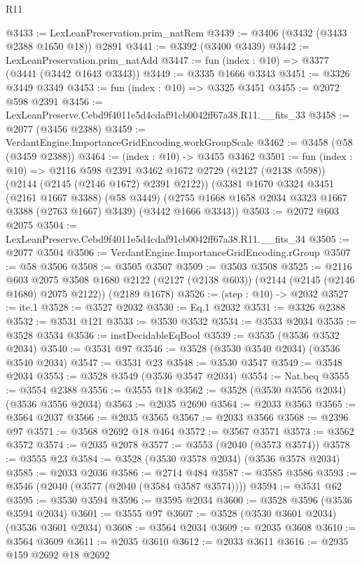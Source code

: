 \begin{lexlean}{R11}
\begin{coremodule}
@3433 := LexLeanPreservation.prim_natRem
@3439 := @3406 (@3432 (@3433 @2388 @1650 @18)) @2891
@3441 := @3392 (@3400 @3439)
@3442 := LexLeanPreservation.prim_natAdd
@3447 := fun (index : @10) => @3377 (@3441 (@3442 @1643 @3343))
@3449 := @3335 @1666 @3343
@3451 := @3326 @3449 @3349
@3453 := fun (index : @10) => @3325 @3451
@3455 := @2072 @598 @2391
@3456 := LexLeanPreserve.Cebd9f4011e5d4cdaf91cb0042ff67a38.R11.__fits_33
@3458 := @2077 (@3456 @2388)
@3459 := VerdantEngine.ImportanceGridEncoding.workGroupScale
@3462 := @3458 (@58 (@3459 @2388))
@3464 := (index : @10) -> @3455 @3462
@3501 := fun (index : @10) =>
  @2116
    @598
    @2391
    @3462
    @1672
    @2729
    (@2127 (@2138 @598))
    (@2144 (@2145 (@2146 @1672) @2391 @2122))
    (@3381
      @1670
      @3324
      @3451
      (@2161 @1667 @3388)
      (@58 @3449)
      (@2755 @1668 @1658 @2034 @3323 @1667 @3388 (@2763 @1667) @3439)
      (@3442 @1666 @3343))
@3503 := @2072 @603 @2075
@3504 := LexLeanPreserve.Cebd9f4011e5d4cdaf91cb0042ff67a38.R11.__fits_34
@3505 := @2077 @3504
@3506 := VerdantEngine.ImportanceGridEncoding.rGroup
@3507 := @58 @3506
@3508 := @3505 @3507
@3509 := @3503 @3508
@3525 := @2116
    @603
    @2075
    @3508
    @1680
    @2122
    (@2127 (@2138 @603))
    (@2144 (@2145 (@2146 @1680) @2075 @2122))
    (@2189 @1678)
@3526 := (step : @10) -> @2032
@3527 := ite.{1}
@3528 := @3527 @2032
@3530 := Eq.{1} @2032
@3531 := @3326 @2388
@3532 := @3531 @121
@3533 := @3530 @3532
@3534 := @3533 @2034
@3535 := @3528 @3534
@3536 := instDecidableEqBool
@3539 := @3535 (@3536 @3532 @2034)
@3540 := @3531 @97
@3546 := @3528 (@3530 @3540 @2034) (@3536 @3540 @2034)
@3547 := @3531 @23
@3548 := @3530 @3547
@3549 := @3548 @2034
@3553 := @3528 @3549 (@3536 @3547 @2034)
@3554 := Nat.beq
@3555 := @3554 @2388
@3556 := @3555 @18
@3562 := @3528 (@3530 @3556 @2034) (@3536 @3556 @2034)
@3563 := @2035 @2690
@3564 := @2033 @3563
@3565 := @3564 @2037
@3566 := @2035 @3565
@3567 := @2033 @3566
@3568 := @2396 @97
@3571 := @3568 @2692 @18 @464
@3572 := @3567 @3571
@3573 := @3562 @3572
@3574 := @2035 @2078
@3577 := @3553 (@2040 (@3573 @3574))
@3578 := @3555 @23
@3584 := @3528 (@3530 @3578 @2034) (@3536 @3578 @2034)
@3585 := @2033 @2036
@3586 := @2714 @484
@3587 := @3585 @3586
@3593 := @3546 (@2040 (@3577 (@2040 (@3584 @3587 @3574))))
@3594 := @3531 @62
@3595 := @3530 @3594
@3596 := @3595 @2034
@3600 := @3528 @3596 (@3536 @3594 @2034)
@3601 := @3555 @97
@3607 := @3528 (@3530 @3601 @2034) (@3536 @3601 @2034)
@3608 := @3564 @2034
@3609 := @2035 @3608
@3610 := @3564 @3609
@3611 := @2035 @3610
@3612 := @2033 @3611
@3616 := @2935 @159 @2692 @18 @2692

\end{coremodule}
\end{lexlean}
